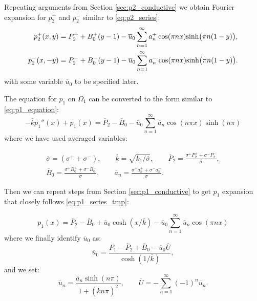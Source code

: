 \documentclass[a4paper,10pt]{article}
\def\ol#1{\overline{#1}}
\begin{document}
Repeating arguments from Section \ref{sec:p2_conductive} we obtain Fourier expansion for $p_2^+$ and $p_2^-$ similar to \eqref{eq:p2_series}:
\begin{align}
    \label{eq:p2_barrier_p}
    p_2^+(x,  y) &= P_2^+ + B_0^+(y-1) - \ol{u}_0\sum_{n=1}^\infty a_n^+ \cos(\pi n x) {\rm sinh} \big(\pi n(1-y)\big),\\ 
    \label{eq:p2_barrier_m}
    p_2^-(x, -y) &= P_2^- + B_0^-(y-1) - \ol{u}_0\sum_{n=1}^\infty a_n^- \cos(\pi n x) {\rm sinh} \big(\pi n(1-y)\big).
\end{align}
with some variable $\ol{u}_0$ to be specified later.

The equation for $p_1$ on $\Omega_1$ can be converted to the form similar to \eqref{eq:p1_equation}:
\begin{equation}
    \label{eq:p1_barrier_equation}
    - \ol{k}  p_1''(x) + p_1(x) = \ol{P}_2 - \ol{B}_0 - \ol{u}_0\sum_{n=1}^{\infty} \ol{a}_n \cos(n \pi x) \sinh(n \pi)
\end{equation}
where we have used averaged variables:


\begin{gather*}
    \ol{\sigma} = (\sigma^+ + \sigma^-), \qquad
    \ol{k} = \sqrt{k_1/\ol{\sigma}}, \qquad
    \ol{P}_2 = \frac{\sigma^+ P_2^+ + \sigma^- P_2^-}{\ol{\sigma}}, \\
%    
    \ol{B}_0 = \frac{\sigma^+ B_0^+ + \sigma^- B_0^-}{\ol{\sigma}}, \qquad
    \ol{a}_n = \frac{\sigma^+ a_n^+ + \sigma^- a_n^-}{\ol{\sigma}}.  
\end{gather*}

Then we can repeat steps from Section \ref{sec:p1_conductive} to get $p_1$ expansion that closely follows
\eqref{eq:p1_series_tmp}:

\begin{equation}
    \label{eq:barrier_p1_series}
    p_1(x) = \ol{P}_2 -  \ol{B}_0 + \ol{u}_0 \cosh(x/\ol{k}) - \ol{u}_0 \sum_{n=1}^\infty  \ol{u}_n \cos(\pi n x) 
\end{equation}
where we finally identify $\ol{u}_0$ as:
\begin{equation}
    \label{eq:barrier_u0_def}    
    \ol{u}_0 = \frac{P_1 - \ol{P}_2 + \ol{B}_0 - \ol{u}_0 \ol{U}}{\cosh(1/\ol{k})},
\end{equation}
and we set:
\begin{equation}
    \label{eq:barrier_un}
    \ol{u}_n = \frac{\ol{a}_n \sinh(n \pi)}{1 + (\ol{k} n \pi)^2}, \qquad
    \ol{U} =  -\sum_{n=1}^{\infty} (-1)^n \ol{u}_n.
\end{equation}
\end{document}
